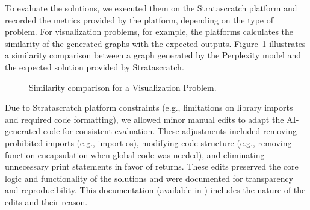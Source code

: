\documentclass[conference]{IEEEtran}
\begin{document}
To evaluate the solutions, we executed them on the Stratascratch platform and recorded the metrics provided by the platform, depending on the type of problem. For visualization problems, for example, the platforms calculates the similarity of the generated graphs with the expected outputs. Figure~\ref{fig:similarity-comparison} illustrates a similarity comparison between a graph generated by the Perplexity model and the expected solution provided by Stratascratch.

\begin{figure}[H] 
\centering 
{} 
\caption{Similarity comparison for a Visualization Problem.}
\label{fig:similarity-comparison} 
\end{figure}

Due to Stratascratch platform constraints (e.g., limitations on library imports and required code formatting), we allowed minor manual edits to adapt the AI-generated code for consistent evaluation. These adjustments included removing prohibited imports (e.g., import os), modifying code structure (e.g., removing function encapsulation when global code was needed), and eliminating unnecessary print statements in favor of returns. These edits preserved the core logic and functionality of the solutions and were documented for transparency and reproducibility. This documentation (available in \cite{EASER_LLM4Code_Study4_2023}) includes the nature of the edits and their reason.
\end{document}
